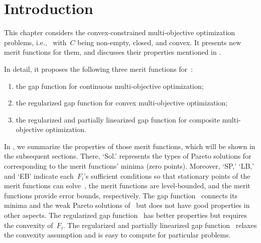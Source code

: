 \documentclass[../main]{subfiles}
\begin{document}
\section{Introduction}
This chapter considers the convex-constrained multi-objective optimization problems, i.e.,~ with~$C$ being non-empty, closed, and convex.
It presents new merit functions for them, and discusses their properties mentioned in .

In detail, it proposes the following three merit functions for~: 
\begin{enumerate}
    \item the gap function for continuous multi-objective optimization; 
    \item the regularized gap function for convex multi-objective optimization; 
    \item the regularized and partially linearized gap function for composite multi-objective optimization. 
\end{enumerate}
In , we summarize the properties of those merit functions, which will be shown in the subsequent sections.
There, `Sol.' represents the types of Pareto solutions for~ corresponding to the merit functions' minima (zero points).
Moreover, `SP,' `LB,' and `EB' indicate each~$F_i$'s sufficient conditions so that stationary points of the merit functions can solve~, the merit functions are level-bounded, and the merit functions provide error bounds, respectively.
The gap function~ connects its minima and the weak Pareto solutions of~ but does not have good properties in other aspects.
The regularized gap function~ has better properties but requires the convexity of~$F_i$.
The regularized and partially linearized gap function~ relaxes the convexity assumption and is easy to compute for particular problems.
\end{document}
